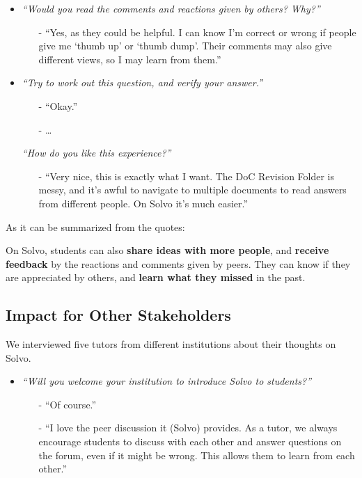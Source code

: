\documentclass[a4paper]{article}
\begin{document}
    \begin{itemize}
        \item \textit{``Would you read the comments and reactions given by others? Why?''}
        \begin{itemize}
            \item[-] ``Yes, as they could be helpful.
            I can know I'm correct or wrong if people give me `thumb up' or `thumb dump'.
            Their comments may also give different views, so I may learn from them.''
        \end{itemize}

        \item \textit{``Try to work out this question, and verify your answer.''}
        \begin{itemize}
            \item[-] ``Okay.''
            \item[-] \ldots
        \end{itemize}
        \textit{``How do you like this experience?''}
        \begin{itemize}
            \item[-] ``Very nice, this is exactly what I want.
            The DoC Revision Folder is messy, and it's awful to navigate to multiple documents to read answers from different people.
            On Solvo it's much easier.''
        \end{itemize}
    \end{itemize}

    \noindent As it can be summarized from the quotes:

    On Solvo, students can also \textbf{share ideas with more people}, and \textbf{receive feedback} by the reactions and comments given by peers.
    They can know if they are appreciated by others, and \textbf{learn what they missed} in the past.

    \subsection*{Impact for Other Stakeholders}

    \noindent We interviewed five tutors from different institutions about their thoughts on Solvo.

    \begin{itemize}
        \item \textit{``Will you welcome your institution to introduce Solvo to students?''}
        \begin{itemize}
            \item[-] ``Of course.''
            \item[-] ``I love the peer discussion it (Solvo) provides.
            As a tutor, we always encourage students to discuss with each other and answer questions on the forum, even if it might be wrong.
            This allows them to learn from each other.''
        \end{itemize}
    \end{itemize}
\end{document}
